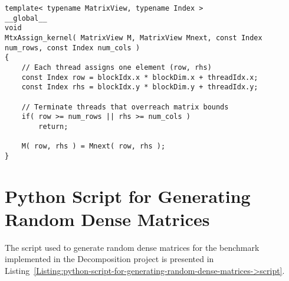 \begin{lstlisting}[caption={Implementation of the \code{MtxAssign\_kernel()} kernel that assigns values of the next iteration to the matrix representing the current iteration.},label={Listing:ISxPP-implementation->kernels->matrix-assign}]
template< typename MatrixView, typename Index >
__global__
void
MtxAssign_kernel( MatrixView M, MatrixView Mnext, const Index num_rows, const Index num_cols )
{
	// Each thread assigns one element (row, rhs)
	const Index row = blockIdx.x * blockDim.x + threadIdx.x;
	const Index rhs = blockIdx.y * blockDim.y + threadIdx.y;
	
	// Terminate threads that overreach matrix bounds
	if( row >= num_rows || rhs >= num_cols )
		return;
	
	M( row, rhs ) = Mnext( row, rhs );
}
\end{lstlisting}





\chapter{Python Script for Generating Random Dense Matrices}\label{Appendix:python-script-for-generating-random-dense-matrices}
The script used to generate random dense matrices for the benchmark implemented in the Decomposition project is presented in Listing~\ref{Listing:python-script-for-generating-random-dense-matrices->script}. 

